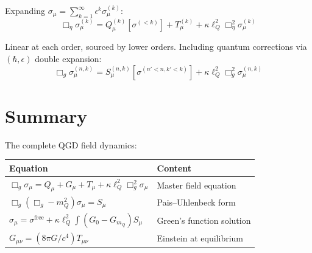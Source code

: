 \documentclass[11pt,a4paper]{article}
\theoremstyle{plain}
\theoremstyle{definition}
\theoremstyle{remark}
\newcommand{\lQ}{\ell_Q}
\newcommand{\mQ}{m_Q}
\begin{document}
Expanding $\sigma_\mu = \sum_{k=1}^\infty\epsilon^k\sigma_\mu^{(k)}$:
\begin{equation}
  \Box_\eta\sigma_\mu^{(k)} = Q_\mu^{(k)}[\sigma^{(<k)}] + T_\mu^{(k)} + \kappa\lQ^2\Box_\eta^2\sigma_\mu^{(k)}
\end{equation}

Linear at each order, sourced by lower orders.  Including quantum corrections via $(\hbar,\epsilon)$ double expansion:
\begin{equation}
  \Box_g\sigma_\mu^{(n,k)} = S_\mu^{(n,k)}[\sigma^{(n'<n,k'<k)}] + \kappa\lQ^2\Box_g^2\sigma_\mu^{(n,k)}
\end{equation}

\section{Summary}

The complete QGD field dynamics:

\begin{table}[h]
  \centering
  \renewcommand{\arraystretch}{1.4}
  \begin{tabular}{@{}lp{9.5cm}@{}}
    \toprule
    Equation & Content \\
    \midrule
    $\Box_g\sigma_\mu = Q_\mu + G_\mu + T_\mu + \kappa\lQ^2\Box_g^2\sigma_\mu$ & Master field equation \\
    $\Box_g(\Box_g - \mQ^2)\sigma_\mu = S_\mu$ & Pais--Uhlenbeck form \\
    $\sigma_\mu = \sigma^{\mathrm{free}} + \kappa\lQ^2\!\int(G_0 - G_{\mQ})S_\mu$ & Green's function solution \\
    $G_{\mu\nu} = (8\pi G/c^4)T_{\mu\nu}$ & Einstein at equilibrium \\
    \bottomrule
  \end{tabular}
\end{table}
\end{document}
